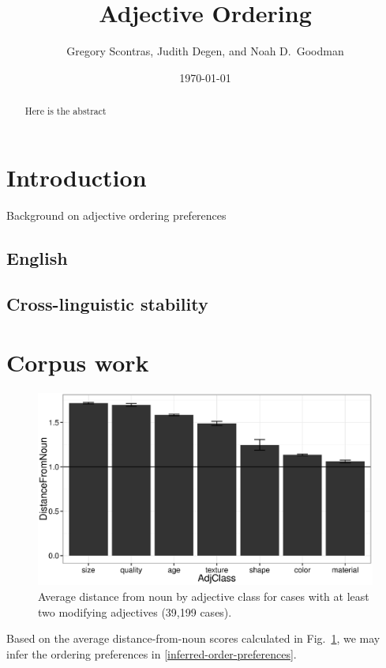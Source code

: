 \documentclass[11pt]{article}
\title{Adjective Ordering}
\author{Gregory Scontras, Judith Degen, and Noah D.~Goodman}
\date{\today}
\begin{document}
\thispagestyle{plain}

\maketitle

\begin{abstract}
	Here is the abstract
\end{abstract}

\tableofcontents

\section{Introduction}

Background on adjective ordering preferences

\subsection{English}

\subsection{Cross-linguistic stability}


\section{Corpus work} \label{corpus}

\begin{figure}[h!]
	\centering
	\includegraphics[width=.8\linewidth]{plots/distance_from_noun.eps}
	\caption{Average distance from noun by adjective class for cases with at least two modifying adjectives (39,199 cases).}\label{distance-from-noun}
\end{figure}

Based on the average distance-from-noun scores calculated in Fig.~\ref{distance-from-noun}, we may infer the ordering preferences in \ref{inferred-order-preferences}.
\end{document}
